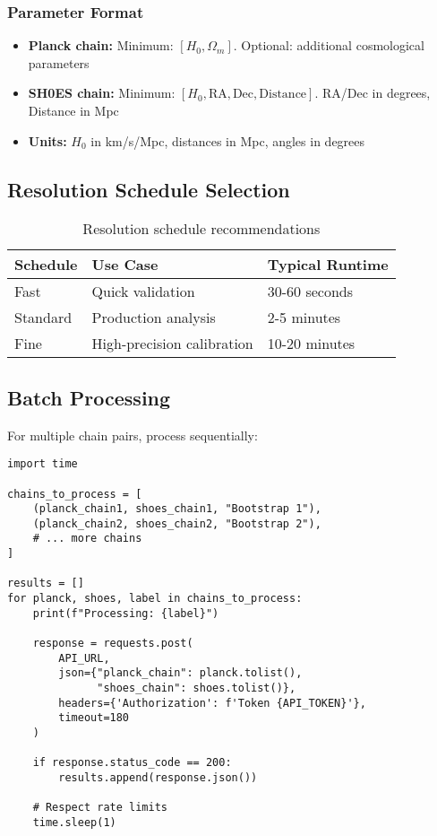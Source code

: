 \documentclass[11pt]{article}
\begin{document}
\subsubsection{Parameter Format}
\begin{itemize}
    \item \textbf{Planck chain:} Minimum: $[H_0, \Omega_m]$. Optional: additional cosmological parameters
    \item \textbf{SH0ES chain:} Minimum: $[H_0, \text{RA}, \text{Dec}, \text{Distance}]$. RA/Dec in degrees, Distance in Mpc
    \item \textbf{Units:} $H_0$ in km/s/Mpc, distances in Mpc, angles in degrees
\end{itemize}

\subsection{Resolution Schedule Selection}

\begin{table}[h]
\centering
\begin{tabular}{@{}lll@{}}
\toprule
\textbf{Schedule} & \textbf{Use Case} & \textbf{Typical Runtime} \\ \midrule
Fast & Quick validation & 30-60 seconds \\
Standard & Production analysis & 2-5 minutes \\
Fine & High-precision calibration & 10-20 minutes \\ \bottomrule
\end{tabular}
\caption{Resolution schedule recommendations}
\label{tab:schedules}
\end{table}

\subsection{Batch Processing}

For multiple chain pairs, process sequentially:

\begin{lstlisting}[style=python, caption={Batch processing example}]
import time

chains_to_process = [
    (planck_chain1, shoes_chain1, "Bootstrap 1"),
    (planck_chain2, shoes_chain2, "Bootstrap 2"),
    # ... more chains
]

results = []
for planck, shoes, label in chains_to_process:
    print(f"Processing: {label}")

    response = requests.post(
        API_URL,
        json={"planck_chain": planck.tolist(),
              "shoes_chain": shoes.tolist()},
        headers={'Authorization': f'Token {API_TOKEN}'},
        timeout=180
    )

    if response.status_code == 200:
        results.append(response.json())

    # Respect rate limits
    time.sleep(1)
\end{lstlisting}
\end{document}

